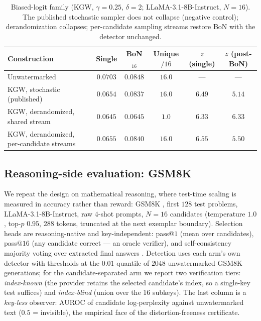 \documentclass{article} %
\begin{document}
\begin{table}[h]
\caption{Biased-logit family (KGW, $\gamma{=}0.25$, $\delta{=}2$;
LLaMA-3.1-8B-Instruct, $N{=}16$). The published stochastic sampler does not
collapse (negative control); derandomization collapses; per-candidate
sampling streams restore BoN with the detector unchanged.}
\label{tab:kgw}
\begin{center}
\small
\begin{tabular}{lccccc}
\toprule
Construction & Single & BoN$_{16}$ & Unique$/16$ & $z$ (single) & $z$ (post-BoN) \\
\midrule
Unwatermarked & $0.0703$ & $0.0848$ & $16.0$ & --- & --- \\
KGW, stochastic (published) & $0.0654$ & $0.0837$ & $16.0$ & $6.49$ & $5.14$ \\
KGW, derandomized, shared stream & $0.0645$ & $0.0645$ & $1.0$ & $6.33$ & $6.33$ \\
KGW, derandomized, per-candidate streams & $0.0655$ & $0.0840$ & $16.0$ & $6.55$ & $5.50$ \\
\bottomrule
\end{tabular}
\end{center}
\end{table}

\subsection{Reasoning-side evaluation: GSM8K}\label{app:gsm}
We repeat the design on mathematical reasoning, where test-time scaling is
measured in accuracy rather than reward: GSM8K \citep{cobbe2021gsm8k}, first
$128$ test problems, LLaMA-3.1-8B-Instruct, raw $4$-shot prompts, $N{=}16$
candidates (temperature $1.0$, top-$p$ $0.95$, $288$ tokens, truncated at
the next exemplar boundary). Selection heads are reasoning-native and
key-independent: pass@$1$ (mean over candidates), pass@$16$ (any candidate
correct --- an oracle verifier), and self-consistency majority voting over
extracted final answers \citep{wang2023selfconsistency}. Detection uses
each arm's own detector with thresholds at the $0.01$ quantile of $2048$
unwatermarked GSM8K generations; for the candidate-separated arm we report
two verification tiers: \emph{index-known} (the provider retains the
selected candidate's index, so a single-key test suffices) and
\emph{index-blind} (union over the $16$ subkeys). The last column is a
\emph{key-less} observer: AUROC of candidate log-perplexity against
unwatermarked text ($0.5$ = invisible), the empirical face of the
distortion-freeness certificate.
\end{document}
